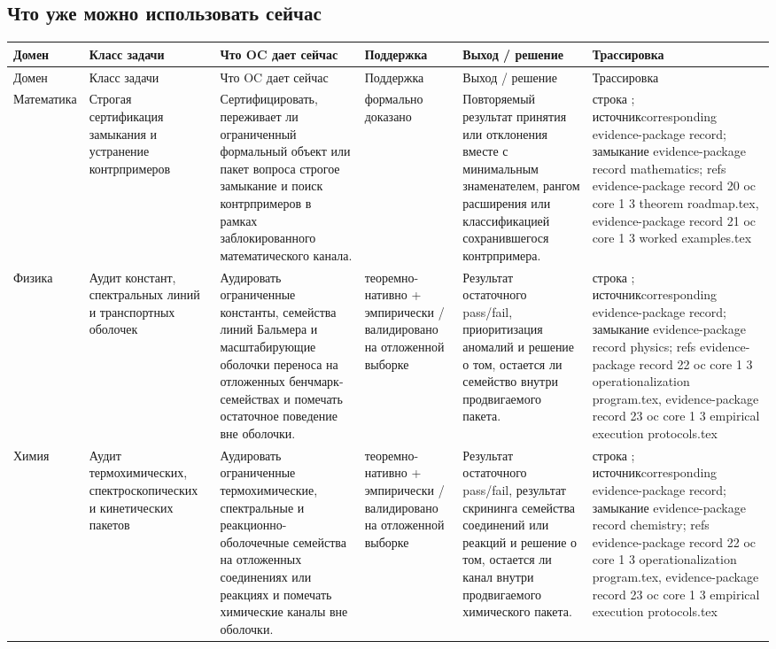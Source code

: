\subsection{Что уже можно использовать сейчас}
\begingroup
\scriptsize
\setlength{\emergencystretch}{1.5em}
\setlength{\tabcolsep}{2pt}
\setlength{\LTleft}{0pt}
\setlength{\LTright}{0pt}
\begin{longtable}{@{}L{0.11\textwidth}L{0.16\textwidth}L{0.19\textwidth}L{0.12\textwidth}L{0.18\textwidth}L{0.16\textwidth}@{}}
\toprule
Домен & Класс задачи & Что OC дает сейчас & Поддержка & Выход / решение & Трассировка \\
\midrule
\endfirsthead
\toprule
Домен & Класс задачи & Что OC дает сейчас & Поддержка & Выход / решение & Трассировка \\
\midrule
\endhead
Математика & Строгая сертификация замыкания и устранение контрпримеров & Сертифицировать, переживает ли ограниченный формальный объект или пакет вопроса строгое замыкание и поиск контрпримеров в рамках заблокированного математического канала. & формально доказано & Повторяемый результат принятия или отклонения вместе с минимальным знаменателем, рангом расширения или классификацией сохранившегося контрпримера. & строка ; \allowbreak источникcorresponding evidence-package record; \allowbreak замыкание evidence-package record mathematics; \allowbreak refs evidence-package record 20 oc core 1 3 theorem roadmap.tex, \allowbreak evidence-package record 21 oc core 1 3 worked examples.tex \\
Физика & Аудит констант, спектральных линий и транспортных оболочек & Аудировать ограниченные константы, семейства линий Бальмера и масштабирующие оболочки переноса на отложенных бенчмарк-семействах и помечать остаточное поведение вне оболочки. & теоремно-нативно + эмпирически / валидировано на отложенной выборке & Результат остаточного pass/fail, приоритизация аномалий и решение о том, остается ли семейство внутри продвигаемого пакета. & строка ; \allowbreak источникcorresponding evidence-package record; \allowbreak замыкание evidence-package record physics; \allowbreak refs evidence-package record 22 oc core 1 3 operationalization program.tex, \allowbreak evidence-package record 23 oc core 1 3 empirical execution protocols.tex \\
Химия & Аудит термохимических, спектроскопических и кинетических пакетов & Аудировать ограниченные термохимические, спектральные и реакционно-оболочечные семейства на отложенных соединениях или реакциях и помечать химические каналы вне оболочки. & теоремно-нативно + эмпирически / валидировано на отложенной выборке & Результат остаточного pass/fail, результат скрининга семейства соединений или реакций и решение о том, остается ли канал внутри продвигаемого химического пакета. & строка ; \allowbreak источникcorresponding evidence-package record; \allowbreak замыкание evidence-package record chemistry; \allowbreak refs evidence-package record 22 oc core 1 3 operationalization program.tex, \allowbreak evidence-package record 23 oc core 1 3 empirical execution protocols.tex \\

\end{longtable}
